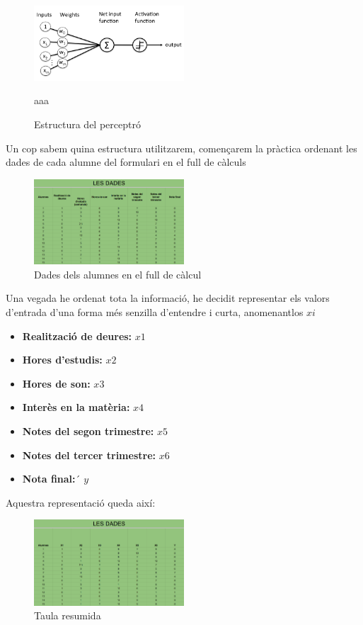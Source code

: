 \begin{figure}[H]
    \centering
    \includegraphics[width=0.5\textwidth]{./figures/perceptro.png}
    \caption{Estructura del perceptró}aaa
\end{figure}

Un cop sabem quina estructura utilitzarem, començarem la pràctica ordenant les dades de cada alumne del formulari en el full de càlculs

\begin{figure}[H]
    \centering
    \includegraphics[width=0.5\textwidth]{./figures/Dades.png}
    \caption{Dades dels alumnes en el full de càlcul}
\end{figure}

Una vegada he ordenat tota la informació, he decidit representar els valors d'entrada d'una forma més senzilla d'entendre i curta, anomenantlos $xi$
\begin{itemize}
 \item \textbf {Realització de deures:} $x1$
 \item \textbf {Hores d'estudis:} $x2$
 \item \textbf {Hores de son:} $x3$
 \item \textbf {Interès en la matèria:} $x4$
 \item \textbf {Notes del segon trimestre:} $x5$
 \item \textbf {Notes del tercer trimestre:} $x6$
 \item \textbf {Nota final:}´ $y$
\end{itemize}

Aquestra representació queda així:

\begin{figure}[H]
    \centering
    \includegraphics[width=0.5\textwidth]{./figures/Dades_resumides.png}
    \caption{Taula resumida}
\end{figure}

